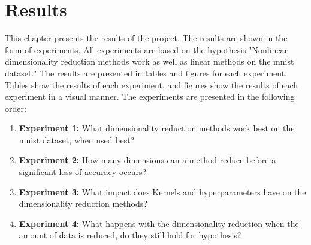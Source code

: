 \chapter{Results}\label{cha:results}
This chapter presents the results of the project. The results are shown in the form of experiments. All experiments are based on the hypothesis "Nonlinear dimensionality reduction methods work as well as linear methods on the \gls{mnist} dataset."
The results are presented in tables and figures for each experiment. Tables show the results of each experiment, and figures show the results of each experiment in a visual manner. The experiments are presented in the following order:
\begin{enumerate}
    \item \textbf{Experiment 1:} What dimensionality reduction methods work best on the \gls{mnist} dataset, when used best?
    \item \textbf{Experiment 2:} How many dimensions can a method reduce before a significant loss of accuracy occurs?
    \item \textbf{Experiment 3:} What impact does Kernels and hyperparameters have on the dimensionality reduction methods?
    \item \textbf{Experiment 4:} What happens with the dimensionality reduction when the amount of data is reduced, do they still hold for hypothesis?
\end{enumerate}






